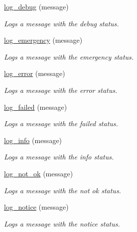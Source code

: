 \begin{DoxyCompactItemize}
\hyperlink{group__log_ga9333570bec5aeb30b11fa1990c74a72a}{log\+\_\+debug} (message)
\begin{DoxyCompactList}\small\item\em Logs a message with the \textquotesingle{}debug\textquotesingle{} status. \end{DoxyCompactList}\item 
\hyperlink{group__log_ga391012c00347e7080504daf878501a8c}{log\+\_\+emergency} (message)
\begin{DoxyCompactList}\small\item\em Logs a message with the \textquotesingle{}emergency\textquotesingle{} status. \end{DoxyCompactList}\item 
\hyperlink{group__log_gaf7fc980e941ae8915356cd89ccac471d}{log\+\_\+error} (message)
\begin{DoxyCompactList}\small\item\em Logs a message with the \textquotesingle{}error\textquotesingle{} status. \end{DoxyCompactList}\item 
\hyperlink{group__log_ga0cb03f40aca4c3da6097aa2578c828ad}{log\+\_\+failed} (message)
\begin{DoxyCompactList}\small\item\em Logs a message with the \textquotesingle{}failed\textquotesingle{} status. \end{DoxyCompactList}\item 
\hyperlink{group__log_ga92ca4a8206896c4a61c287683582defa}{log\+\_\+info} (message)
\begin{DoxyCompactList}\small\item\em Logs a message with the \textquotesingle{}info\textquotesingle{} status. \end{DoxyCompactList}\item 
\hyperlink{group__log_gae751dcb14187d5a6df81d879bf8fc943}{log\+\_\+not\+\_\+ok} (message)
\begin{DoxyCompactList}\small\item\em Logs a message with the \textquotesingle{}not ok\textquotesingle{} status. \end{DoxyCompactList}\item 
\hyperlink{group__log_ga09a7d78f794ff2cc825e3cf0f4bb6b84}{log\+\_\+notice} (message)
\begin{DoxyCompactList}\small\item\em Logs a message with the \textquotesingle{}notice\textquotesingle{} status. \end{DoxyCompactList}\item 

\end{DoxyCompactItemize}
